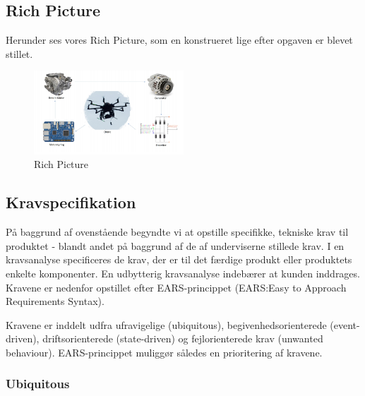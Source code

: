 \subsection{Rich Picture}
\label{sec:rich-picture-}

Herunder ses vores Rich Picture, som en konstrueret lige efter opgaven er blevet stillet.

\begin{figure}[h]
  \centering
  \includegraphics[width=0.5\textwidth]{./figurer/int1.png}
  \caption{Rich Picture}
  \label{fig:int1}
\end{figure}

\subsection{Kravspecifikation}
\label{sec:kravspecifikation}

På baggrund af ovenstående begyndte vi at opstille specifikke, tekniske krav til produktet - blandt andet på baggrund af de af underviserne stillede krav. I en kravsanalyse specificeres de krav, der er til det færdige produkt eller produktets enkelte komponenter. En udbytterig kravsanalyse indebærer at kunden inddrages. Kravene er nedenfor opstillet efter EARS-princippet (EARS:Easy to Approach Requirements Syntax).

Kravene er inddelt udfra ufravigelige (ubiquitous), begivenhedsorienterede (event-driven), driftsorienterede (state-driven) og fejlorienterede krav (unwanted behaviour). EARS-princippet muliggør således en prioritering af kravene.

\subsubsection{Ubiquitous}
\label{sec:kravspecifikation-1}

